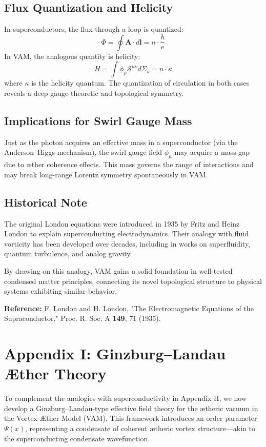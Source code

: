 \subsection{Flux Quantization and Helicity}
In superconductors, the flux through a loop is quantized:
\begin{equation}
    \Phi = \oint \mathbf{A} \cdot d\mathbf{l} = n \cdot \frac{h}{e}
\end{equation}
In VAM, the analogous quantity is helicity:
\begin{equation}
    H = \int \phi_\mu \mathcal{S}^{\mu\nu} d\Sigma_\nu = n \cdot \kappa
\end{equation}
where $\kappa$ is the helicity quantum. The quantization of circulation in both cases reveals a deep gauge-theoretic and topological symmetry.

\subsection{Implications for Swirl Gauge Mass}
Just as the photon acquires an effective mass in a superconductor (via the Anderson–Higgs mechanism), the swirl gauge field $\phi_\mu$ may acquire a mass gap due to æther coherence effects. This mass governs the range of interactions and may break long-range Lorentz symmetry spontaneously in VAM.

\subsection{Historical Note}
The original London equations were introduced in 1935 by Fritz and Heinz London to explain superconducting electrodynamics. Their analogy with fluid vorticity has been developed over decades, including in works on superfluidity, quantum turbulence, and analog gravity.

By drawing on this analogy, VAM gains a solid foundation in well-tested condensed matter principles, connecting its novel topological structure to physical systems exhibiting similar behavior.

\bigskip

\noindent \textbf{Reference:} F. London and H. London, "The Electromagnetic Equations of the Supraconductor," Proc. R. Soc. A \textbf{149}, 71 (1935).

\section{Appendix I: Ginzburg--Landau Æther Theory}
To complement the analogies with superconductivity in Appendix H, we now develop a Ginzburg--Landau-type effective field theory for the ætheric vacuum in the Vortex Æther Model (VAM). This framework introduces an order parameter $\Psi(x)$, representing a condensate of coherent ætheric vortex structure---akin to the superconducting condensate wavefunction.

